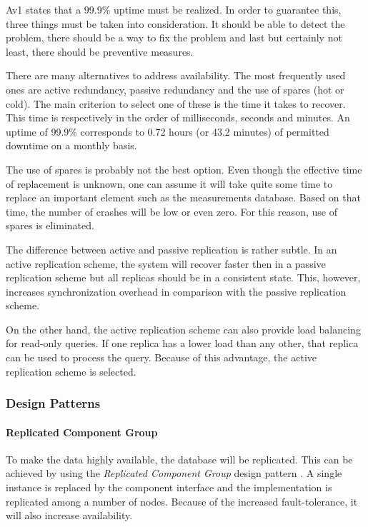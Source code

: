 \npar Av1 states that a 99.9\% uptime must be realized. In order to guarantee
this, three things must be taken into consideration. It should be able to detect
the problem, there should be a way to fix the problem and last but certainly not
least, there should be preventive measures.

\npar There are many alternatives to address availability. The most frequently
used ones are active redundancy, passive redundancy and the use of spares (hot
or cold). The main criterion to select one of these is the time it takes to
recover. This time is respectively in the order of milliseconds, seconds and
minutes. An uptime of 99.9\% corresponds to 0.72 hours (or 43.2 minutes) of
permitted downtime on a monthly basis. 

\npar The use of spares is probably not the best option. Even though the
effective time of replacement is unknown, one can assume it will take quite some
time to replace an important element such as the measurements database. Based on
that time, the number of crashes will be low or even zero. For this reason, use
of spares is eliminated.

\npar The difference between active and passive replication is rather subtle.
In an active replication scheme, the system will recover faster then in a
passive replication scheme but all replicas should be in a consistent
state. This, however, increases synchronization overhead in comparison with
the passive replication scheme.

\npar On the other hand, the active replication scheme can also provide load
balancing for read-only queries. If one replica has a lower load than any other,
that replica can be used to process the query. Because of this advantage, the
active replication scheme is selected.

\subsubsection{Design Patterns}
\label{add:it4/patterns}

\paragraph{Replicated Component Group} 

\npar To make the data highly available, the database will be replicated. This
can be achieved by using the \emph{Replicated Component Group} design pattern
\citep[see][p.~326]{Buschmann:07}. A single instance is replaced by the
component interface and the implementation is replicated among a number of
nodes. Because of the increased fault-tolerance, it will also increase availability.

